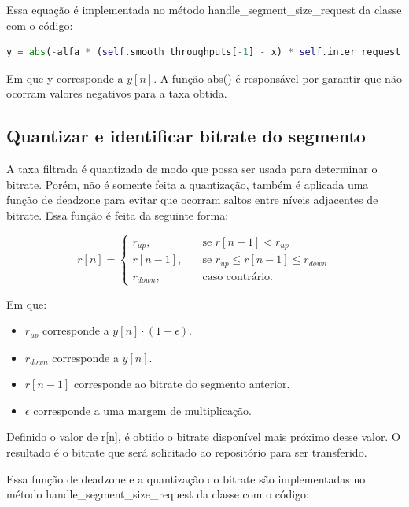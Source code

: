 \documentclass[10pt,twocolumn,letterpaper]{article}
\begin{document}
	Essa equação é implementada no método handle\_segment\_size\_request da classe com o código:
	
	\begin{lstlisting}[language=python]
y = abs(-alfa * (self.smooth_throughputs[-1] - x) * self.inter_request_time[-1] + self.smooth_throughputs[-1])
	\end{lstlisting}
	
	Em que y corresponde a $y[n]$. A função abs() é responsável por garantir que não ocorram valores negativos para a taxa obtida.
	
	\subsection{Quantizar e identificar bitrate do segmento}
	
	A taxa filtrada é quantizada de modo que possa ser usada para determinar o bitrate. Porém, não é somente feita a quantização, também é aplicada uma função de deadzone para evitar que ocorram saltos entre níveis adjacentes de bitrate. Essa função é feita da seguinte forma:
	
	\begin{equation}
		r[n] = 
		\begin{cases}
			r_{up},       & \quad \text{se } r[n-1] < r_{up}\\
			r[n-1],       & \quad \text{se } r_{up} \leq r[n-1] \leq r_{down} \\
			r_{down},       & \quad \text{caso contrário.}
		\end{cases}
	\end{equation}
	
	Em que:
	\begin{itemize}
		\item $r_{up}$ corresponde a $y[n] \cdot (1 - \epsilon)$.
		\item $r_{down}$ corresponde a $y[n]$.
		\item $r[n-1]$ corresponde ao bitrate do segmento anterior.
		\item $\epsilon$ corresponde a uma margem de multiplicação.
	\end{itemize}
	
	Definido o valor de r[n], é obtido o bitrate disponível mais próximo desse valor. O resultado é o bitrate que será solicitado ao repositório para ser transferido.
	
	Essa função de deadzone e a quantização do bitrate são implementadas no método handle\_segment\_size\_request da classe com o código:
	
\end{document}
